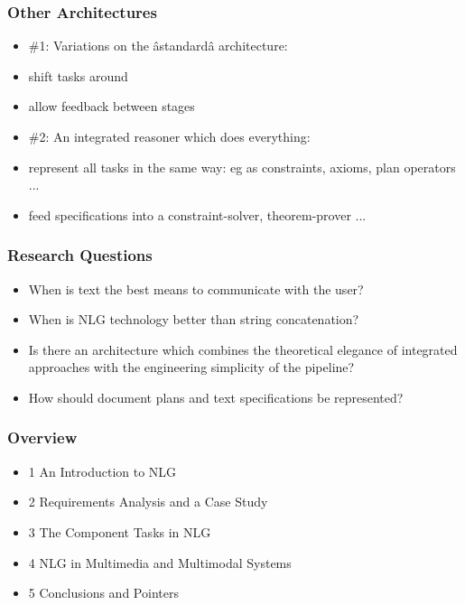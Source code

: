\documentclass[compress,color=usenames]{beamer}
\begin{document}
\begin{frame}
\frametitle{Other Architectures}

\label{f60}
\begin{itemize}
\item { {\#1: Variations on the \^astandard\^a architecture:}}
\item { {shift tasks around}}
\item { {allow feedback between stages}}
\item { {\#2: An integrated reasoner which does everything:}}
\item { {represent all tasks in the same way: eg as constraints, axioms, plan operators ...}}
\item { {feed specifications into a constraint-solver, theorem-prover ...}}
\end{itemize}

\end{frame}

\begin{frame}
\frametitle{Research Questions}

\label{f62}
\begin{itemize}
\item { {When is text the best means to communicate with the user?}}
\item { {When is NLG technology better than string concatenation?}}
\item { {Is there an architecture which combines the theoretical elegance of integrated approaches with the engineering simplicity of the pipeline?}}
\item { {How should document plans and text specifications be represented?}}
\end{itemize}

\end{frame}

\begin{frame}
\frametitle{Overview}

\label{f64}
\begin{itemize}
\item { {1 An Introduction to NLG}}
\item { {2 Requirements Analysis and a Case Study}}
\item { {3 The Component Tasks in NLG}}
\item { {4 NLG in Multimedia and Multimodal Systems}}
\item { {5 Conclusions and Pointers}}
\end{itemize}

\end{frame}
\end{document}
